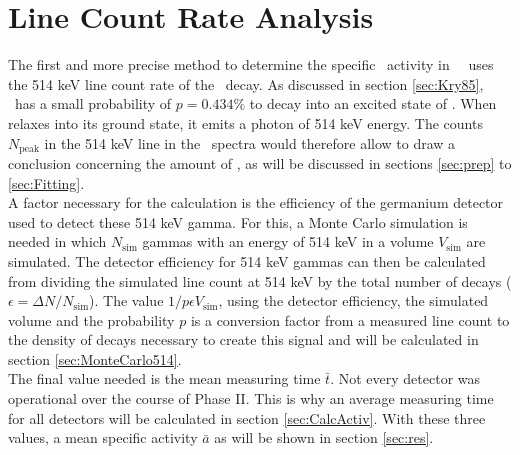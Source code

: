 \documentclass[encoding=utf8,british]{tumphthesis}
\begin{document}
 
 
 
 
 
 
 
 
 
 
 
 
 
 
 
 
 
 
 
 
 
 
 
\chapter{Line Count Rate Analysis}
\label{sec:SAfrom514}

The first and more precise method to determine the specific \Kr\ activity in \gerda\ \PII\ uses the 514 keV line count rate of the \Kr\ decay.
As discussed in section \ref{sec:Kry85}, \Kr\ has a small probability of $p=0.434\%$ to decay into an excited state of . 
When  relaxes into its ground state, it emits a photon of 514 keV energy.
The counts $N_{\mathrm{peak}}$ in the 514 keV line in the \gerda\ spectra would therefore allow to draw a conclusion concerning the amount of \Kr, as will be discussed in sections \ref{sec:prep} to \ref{sec:Fitting}. 
\\

A factor necessary for the calculation is the efficiency of the germanium detector used to detect these 514 keV gamma.
For this, a Monte Carlo simulation is needed in which $N_{\mathrm{sim}}$ gammas with an energy of 514 keV  in a  volume $V_{\mathrm{sim}}$ are simulated.
The detector efficiency for 514 keV gammas can then be calculated from dividing the simulated line count at 514 keV by the total number of  decays ($\epsilon = \Delta N/N_{\mathrm{sim}}$).
The value $1/p \epsilon V_{\mathrm{sim}}$, using the detector efficiency, the simulated volume and the probability $p$ is a conversion factor from a measured line count to the density of decays necessary to create this signal and will be calculated in section \ref{sec:MonteCarlo514}.
\\

The final value needed is the mean measuring time $\bar{t}$.
Not every detector was operational over the course of Phase II.
This is why an average measuring time for all detectors will be calculated in section \ref{sec:CalcActiv}.
With these three values, a mean specific activity $\bar{a}$ as will be shown in section \ref{sec:res}.
\end{document}

